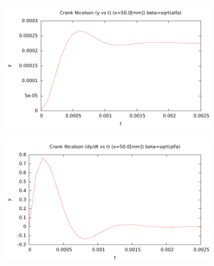 \begin{center}
\begin{figure} [H]
	\begin{subfigure}[b]{0.3\textwidth}
		\includegraphics{./parte3/graficos/grafico_cn_S1_y_b1.pdf}
		\caption{} 
		\label{fig:cnS1b1_y}
	\end{subfigure}
	
	\begin{subfigure}[b]{0.3\textwidth}
		\includegraphics{./parte3/graficos/grafico_cn_S1_dy_b1.pdf}
		\caption{} 
		\label{fig:cnS1b1_dy}
	\end{subfigure}
\caption{} \label{cn_S1_b1}
\end{figure}
\end{center}

